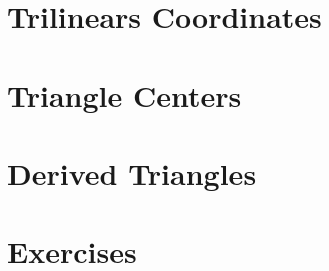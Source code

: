 \section{Trilinears Coordinates}
\label{app:Atrilins}


\section{Triangle Centers}
\label{app:Atri-ctrs}


\section{Derived Triangles}
\label{app:Aderived}


\section{Exercises}
\label{app:A-exercises}


